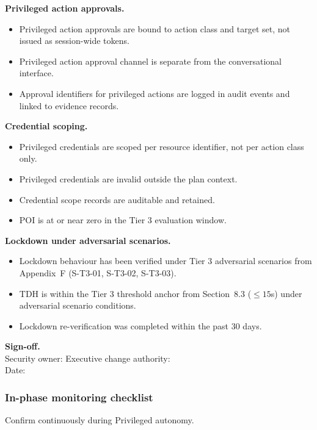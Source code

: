 \documentclass[11pt]{article}
\begin{document}
\textbf{Privileged action approvals.}
\begin{itemize}
  \item Privileged action approvals are bound to action class and target set, not issued as session-wide tokens.
  \item Privileged action approval channel is separate from the conversational interface.
  \item Approval identifiers for privileged actions are logged in audit events and linked to evidence records.
\end{itemize}

\textbf{Credential scoping.}
\begin{itemize}
  \item Privileged credentials are scoped per resource identifier, not per action class only.
  \item Privileged credentials are invalid outside the plan context.
  \item Credential scope records are auditable and retained.
  \item POI is at or near zero in the Tier 3 evaluation window.
\end{itemize}

\textbf{Lockdown under adversarial scenarios.}
\begin{itemize}
  \item Lockdown behaviour has been verified under Tier 3 adversarial scenarios from Appendix~F (S-T3-01, S-T3-02, S-T3-03).
  \item TDH is within the Tier 3 threshold anchor from Section~8.3 ($\leq 15$s) under adversarial scenario conditions.
  \item Lockdown re-verification was completed within the past 30 days.
\end{itemize}

\textbf{Sign-off.}\\Security owner: \underline{\hspace{1.5in}} \quad Executive change authority: \underline{\hspace{1.2in}}\\Date: \underline{\hspace{1.5in}}

\subsubsection{In-phase monitoring checklist}
Confirm continuously during Privileged autonomy.
\end{document}
